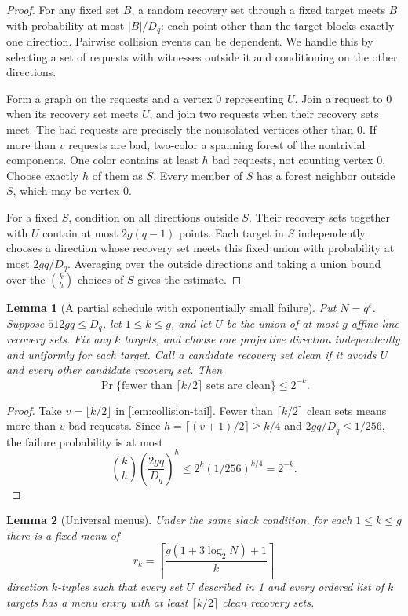 \documentclass[11pt]{article}
\newtheorem{lemma}[lemma]{Lemma}
\begin{document}
\begin{proof}
For any fixed set $B$, a random recovery set through a fixed target meets
$B$ with probability at most $|B|/D_q$: each point other than the target
blocks exactly one direction.  Pairwise collision events can be dependent.
We handle this by selecting a set of requests with witnesses outside it
and conditioning on the other directions.

Form a graph on the requests and a vertex $0$ representing $U$.  Join a
request to $0$ when its recovery set meets $U$, and join two requests when
their recovery sets meet.  The bad requests are precisely the nonisolated
vertices other than $0$.  If more than $v$ requests are bad, two-color a
spanning forest of the nontrivial components.  One color contains at least
$h$ bad requests, not counting vertex $0$.  Choose exactly $h$ of them as
$S$.  Every member of $S$ has a forest neighbor outside $S$, which may be
vertex $0$.

For a fixed $S$, condition on all directions outside $S$.  Their recovery
sets together with $U$ contain at most $2g(q-1)$ points.  Each target in
$S$ independently chooses a direction whose recovery set meets this fixed
union with probability at most $2gq/D_q$.  Averaging over the outside
directions and taking a union bound over the $\binom{k}{h}$ choices of
$S$ gives the estimate.
\end{proof}

\begin{lemma}[A partial schedule with exponentially small failure]
\label{lem:partial-schedule}
Put $N=q^\ell$.  Suppose $512gq\le D_q$, let $1\le k\le g$, and let $U$ be
the union of at most $g$ affine-line recovery sets.  Fix any $k$ targets, and
choose one projective direction independently and uniformly for each target.
Call a candidate recovery set \emph{clean} if it avoids $U$ and every other
candidate recovery set.  Then
\[
  \Pr\{\text{fewer than }\lceil k/2\rceil\text{ sets are clean}\}
  \le 2^{-k}.
\]
\end{lemma}

\begin{proof}
Take $v=\lfloor k/2\rfloor$ in \cref{lem:collision-tail}.  Fewer than
$\lceil k/2\rceil$ clean sets means more than $v$ bad requests.  Since
$h=\lceil(v+1)/2\rceil\ge k/4$ and $2gq/D_q\le1/256$, the failure
probability is at most
\[
 \binom{k}{h}\left(\frac{2gq}{D_q}\right)^h
 \le2^k(1/256)^{k/4}=2^{-k}.
\]
\end{proof}

\begin{lemma}[Universal menus]\label{lem:universal-menus}
Under the same slack condition, for each $1\le k\le g$ there is a fixed menu
of
\begin{equation}\label{eq:menu-size}
  r_k=\left\lceil\frac{g(1+3\log_2N)+1}{k}\right\rceil
\end{equation}
direction $k$-tuples such that every set $U$ described in
\cref{lem:partial-schedule} and every ordered list of $k$ targets has a menu
entry with at least $\lceil k/2\rceil$ clean recovery sets.
\end{lemma}
\end{document}
